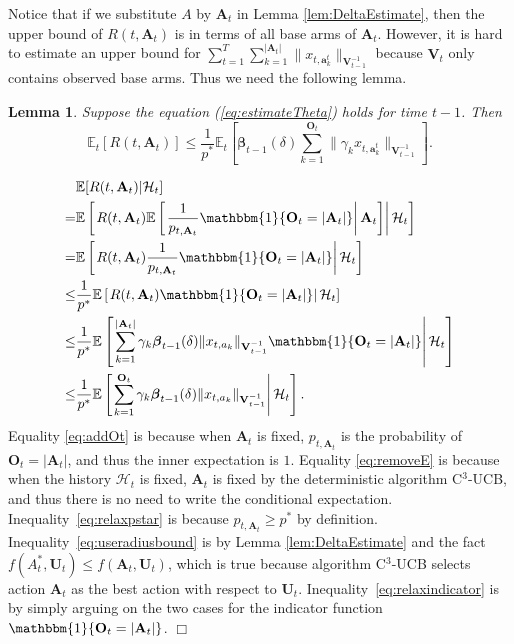 \documentclass{article}
\newcommand{\bbeta}{\boldsymbol{\beta}}
\newcommand{\EE}{\mathbb{E}}
\newcommand{\bOne}{\mathbbm{1}}
\newcommand{\bA}{\mathbf{A}}
\newcommand{\ba}{\mathbf{a}}
\newcommand{\bO}{\mathbf{O}}
\newcommand{\bU}{\mathbf{U}}
\newcommand{\bV}{\mathbf{V}}
\newcommand{\cH}{\mathcal{H}}
\newcommand{\abs}[1]{\left| #1 \right|}
\newcommand{\norm}[1]{\| #1 \|}
\newtheorem{lemma}[theorem]{Lemma}%
\newenvironment{proof}{\noindent {\textbf{Proof. }}}{$\Box$ \medskip}
\begin{document}
Notice that if we substitute $A$ by $\bA_t$ in Lemma \ref{lem:DeltaEstimate}, then the upper bound of $R(t, \bA_t)$ is in terms of all base arms of $\bA_t$. However, it is hard to estimate an upper bound for $\sum_{t=1}^T \sum_{k=1}^{\abs{\bA_t}} \norm{ x_{t, \ba_k^t} }_{ \bV_{t-1}^{-1} }$ because $\bV_t$ only contains observed base arms. Thus we need the following lemma.

\begin{lemma} %
	\label{lem:DeltaEsimateWithP*}
	Suppose the equation (\ref{eq:estimateTheta}) holds for time $t-1$. Then
	$$
	\EE_t[R(t, \bA_t)] \leq \frac{1}{p^*} \EE_t \left[ \bbeta_{t-1}(\delta) \sum_{k=1}^{\bO_t}\norm{\gamma_k x_{t,\ba_k^t}}_{\bV_{t-1}^{-1}} \right].
	$$
\end{lemma}
\begin{proof}
	\begin{align}
		&\EE[R(t, \bA_t)|\cH_t]  \nonumber \\
		=& \EE \left[ \left. R(t, \bA_t) \EE \left[ \left. \frac{1}{p_{t, \bA_t}} \bOne\{\bO_t = \abs{\bA_t}\} \right| \bA_t \right]  \right| \cH_t \right] \label{eq:addOt}\\
		=& \EE \left[ \left. R(t, \bA_t) \frac{1}{p_{t, \bA_t}} \bOne\{\bO_t = \abs{\bA_t}\}  \right| \cH_t \right] \label{eq:removeE}\\
		\leq &\frac{1}{p^{\ast}} \EE \left[ \left. R(t, \bA_t) \bOne\{\bO_t = \abs{\bA_t}\}  \right| \cH_t \right] \label{eq:relaxpstar}\\
		\leq &\frac{1}{p^{\ast}} \EE \left[ \left. \sum_{k=1}^{\abs{\bA_t}} \gamma_k \bbeta_{t-1}(\delta)\norm{x_{t,a_k}}_{\bV_{t-1}^{-1}} \bOne\{\bO_t = \abs{\bA_t}\}  \right| \cH_t \right] \label{eq:useradiusbound}\\
		\leq &\frac{1}{p^{\ast}} \EE \left[ \left. \sum_{k=1}^{\bO_t} \gamma_k \bbeta_{t-1}(\delta)\norm{x_{t,a_k}}_{\bV_{t-1}^{-1}} \right| \cH_t \right]. \label{eq:relaxindicator}
	\end{align}
	Equality \eqref{eq:addOt} is because when $\bA_t$ is fixed, $p_{t, \bA_t}$ is the probability of $\bO_t = \abs{\bA_t}$, and thus the inner expectation is $1$. Equality \eqref{eq:removeE} is because when the history $\cH_t$ is fixed, $\bA_t$ is fixed by the deterministic algorithm C$^3$-UCB, and thus there is no need to write the conditional expectation. Inequality~\eqref{eq:relaxpstar} is because $p_{t,\bA_t} \geq p^*$ by definition. Inequality~\eqref{eq:useradiusbound} is by Lemma \ref{lem:DeltaEstimate} and the fact $f(A_t^*, \bU_t) \leq f(\bA_t, \bU_t)$, which is true because algorithm C$^3$-UCB selects action $\bA_t$ as the best action with respect to $\bU_t$. Inequality~\eqref{eq:relaxindicator} is by simply arguing on the two cases for the indicator function $\bOne\{\bO_t = \abs{\bA_t}\}$.
\end{proof}
\end{document}
